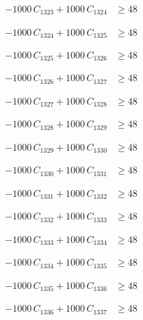 \documentclass[a4paper,11pt]{article}
\begin{document}
\begin{align}
-1000\,C_{1323} + 1000\,C_{1324} &\geq 48 \nonumber
\end{align}

\begin{align}
-1000\,C_{1324} + 1000\,C_{1325} &\geq 48 \nonumber
\end{align}

\begin{align}
-1000\,C_{1325} + 1000\,C_{1326} &\geq 48 \nonumber
\end{align}

\begin{align}
-1000\,C_{1326} + 1000\,C_{1327} &\geq 48 \nonumber
\end{align}

\begin{align}
-1000\,C_{1327} + 1000\,C_{1328} &\geq 48 \nonumber
\end{align}

\begin{align}
-1000\,C_{1328} + 1000\,C_{1329} &\geq 48 \nonumber
\end{align}

\begin{align}
-1000\,C_{1329} + 1000\,C_{1330} &\geq 48 \nonumber
\end{align}

\begin{align}
-1000\,C_{1330} + 1000\,C_{1331} &\geq 48 \nonumber
\end{align}

\begin{align}
-1000\,C_{1331} + 1000\,C_{1332} &\geq 48 \nonumber
\end{align}

\begin{align}
-1000\,C_{1332} + 1000\,C_{1333} &\geq 48 \nonumber
\end{align}

\begin{align}
-1000\,C_{1333} + 1000\,C_{1334} &\geq 48 \nonumber
\end{align}

\begin{align}
-1000\,C_{1334} + 1000\,C_{1335} &\geq 48 \nonumber
\end{align}

\begin{align}
-1000\,C_{1335} + 1000\,C_{1336} &\geq 48 \nonumber
\end{align}

\begin{align}
-1000\,C_{1336} + 1000\,C_{1337} &\geq 48 \nonumber
\end{align}
\end{document}
